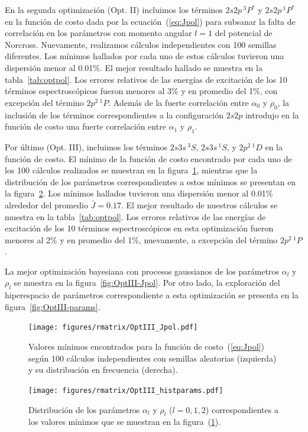 En la segunda optimización (Opt. II) incluimos los términos $2s2p\,^3P^*$ 
y $2s2p\,^1P^*$ en la función de costo dada por la ecuación~(\ref{eq:Jpol}) 
para subsanar la falta de correlación en los parámetros con momento 
angular $l=1$ del potencial de Norcross. Nuevamente, realizamos cálculos 
independientes con 100 semillas diferentes. Los mínimos hallados por cada 
uno de estos cálculos tuvieron una dispersión menor al 0.01\%. El mejor 
resultado hallado se muestra en la tabla~\ref{tab:optpol}. Los errores 
relativos de las energías de excitación de los 10 términos 
espectroscópicos fueron menores al 3\% y en promedio del 1\%, con 
excepción del término $2p^2\,^1P$. Además de la fuerte correlación entre 
$\alpha_0$ y $\rho_0$, la inclusión de los términos correspondientes a la 
configuración $2s2p$ introdujo en la función de costo una fuerte 
correlación entre $\alpha_1$ y $\rho_1$.

Por último (Opt. III), incluimos los términos $2s3s\,^3S$, $2s3s\,^1S$, y 
$2p^2\,^1D$ en la función de costo. El mínimo de la función de costo 
encontrado por cada uno de los 100 cálculos realizados se muestran en la 
figura~\ref{fig:OptIII-100min-Jpol}, mientras que la distribución de los 
parámetros correspondientes a estos mínimos se presentan en la 
figura~\ref{fig:OptIII-100min-params}. Los mínimos hallados tuvieron una 
dispersión menor al 0.01\% alrededor del promedio $\bar{J}=0.17$. El 
mejor resultado de nuestros cálculos se muestra en la 
tabla~\ref{tab:optpol}. Los errores relativos de las energías de 
excitación de los 10 términos espectroscópicos en esta optimización 
fueron menores al 2\% y en promedio del 1\%, nuevamente, a excepción del 
término $2p^2\,^1P$. 

La mejor optimización bayesiana con procesos gaussianos de los parámetros 
$\alpha_l$ y $\rho_l$ se muestra en la figura~\ref{fig:OptIII-Jpol}. Por 
otro lado, la exploración del hiperespacio de parámetros correspondiente
a esta optimización se presenta en la figura~\ref{fig:OptIII-params}. 

\begin{figure}[t]
\centering
\texttt{[image: figures/rmatrix/OptIII\_Jpol.pdf]}
\caption[Mínimos de la función de costo según semillas aleatorias.]
{Valores mínimos encontrados para la función de costo~(\ref{eq:Jpol}) 
según 100 cálculos independientes con semillas aleatorias (izquierda) y
su distribución en frecuencia (derecha).}
\label{fig:OptIII-100min-Jpol}
\end{figure}
\begin{figure}[H]
\centering
\texttt{[image: figures/rmatrix/OptIII\_histparams.pdf]}
\caption[Distribución de parámetros según semillas aleatorias.]
{Distribución de los parámetros $\alpha_l$ y $\rho_l$ ($l=0,1,2$) 
correspondientes a los valores mínimos que se muestran en la 
figura~(\ref{fig:OptIII-100min-Jpol}).}
\label{fig:OptIII-100min-params}
\end{figure}

